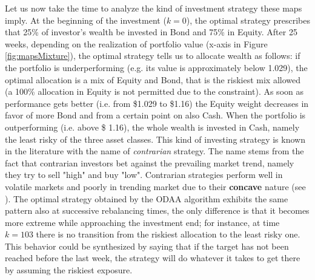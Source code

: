 Let us now take the time to analyze the kind of investment strategy these maps imply. At the beginning of the investment ($k=0$), the optimal strategy prescribes that 25\% of investor's wealth be invested in Bond and 75\% in Equity. After 25 weeks, depending on the realization of portfolio value (x-axis in Figure \ref{fig:mapsMixture}), the optimal strategy tells us to allocate wealth as follows: if the portfolio is underperforming (e.g. its value is approximately below 1.029), the optimal allocation is a mix of Equity and Bond, that is the riskiest mix allowed (a 100\% allocation in Equity is not permitted due to the  constraint). As soon as performance gets better (i.e. from \$1.029 to \$1.16) the Equity weight decreases in favor of more Bond and from a certain point on also Cash. When the portfolio is outperforming (i.e. above \$ 1.16), the whole wealth is invested in Cash, namely the least risky of the three asset classes. This kind of investing strategy is known in the literature with the name of \textit{contrarian} strategy. The name stems from the fact that contrarian investors bet against the prevailing market trend, namely they try to sell "high" and buy "low". Contrarian strategies perform well in volatile markets and poorly in trending market due to their \textbf{concave} nature (see \cite{Perold1988}). The optimal strategy obtained by the ODAA algorithm exhibits the same pattern also at successive rebalancing times, the only difference is that it becomes more extreme while approaching the investment end; for instance, at time $k=103$ there is no transition from the riskiest allocation to the least risky one. This behavior could be synthesized by saying that if the target has not been reached before the last week, the strategy will do whatever it takes to get there by assuming the riskiest exposure.

